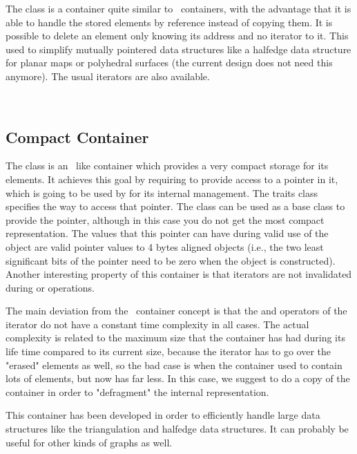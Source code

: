 The class  is a container quite similar
to \stl\ containers, with the advantage that it is able to handle the
stored elements by reference instead of copying them. It is possible
to delete an element only knowing its address and no iterator to it.
This used to simplify mutually pointered data structures like a halfedge
data structure for planar maps or polyhedral surfaces (the current design
does not need this anymore). The usual iterators are also available.

\\

\subsection*{Compact Container}

The class  is an \stl\ like container
which provides a very compact storage for its elements.  It achieves this goal
by requiring  to provide access to a pointer in it, which is going to be
used by  for its internal management.
The traits class  specifies the way to
access that pointer.  The class  can be
used as a base class to provide the pointer, although in this case you do not
get the most compact representation.  The values that this pointer can have
during valid use of the object are valid pointer values to 4 bytes aligned
objects (i.e., the two least significant bits of the pointer need to be zero
when the object is constructed). Another interesting property of this
container is that iterators are not invalidated during  or
 operations.

The main deviation from the \stl\ container concept is that the \ccc{++} and
\ccc{--} operators of the iterator do not have a constant time complexity in
all cases.  The actual complexity is related to the maximum size that the
container has had during its life time compared to its current size, because
the iterator has to go over the "erased" elements as well, so the bad case is
when the container used to contain lots of elements, but now has far less.  In
this case, we suggest to do a copy of the container in order to "defragment"
the internal representation.

This container has been developed in order to efficiently handle large data
structures like the triangulation and halfedge data structures.  It can
probably be useful for other kinds of graphs as well.

